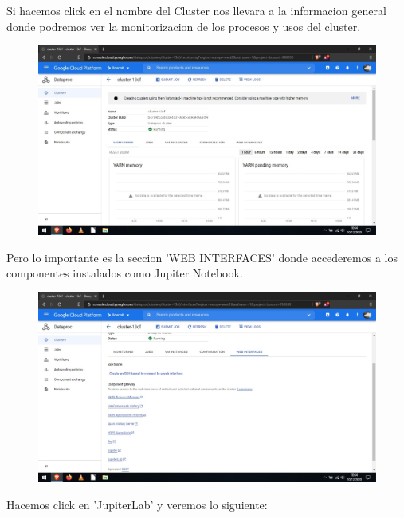 \documentclass[a4paper,10pt]{article}
\begin{document}
Si hacemos click en el nombre del Cluster nos llevara a la informacion general donde podremos ver la monitorizacion de los procesos y usos del cluster.

\begin{figure}[H]
\begin{center}
\includegraphics[width=500pt]{./fotos/GoogleCloud/36 - GC.jpg}
\end{center}
\end{figure}

Pero lo importante es la seccion 'WEB INTERFACES' donde accederemos a los componentes instalados como Jupiter Notebook.
 
\begin{figure}[H]
\begin{center}
\includegraphics[width=500pt]{./fotos/GoogleCloud/37 - GC.jpg}
\end{center}
\end{figure}

Hacemos click en 'JupiterLab' y veremos lo siguiente:
\end{document}
